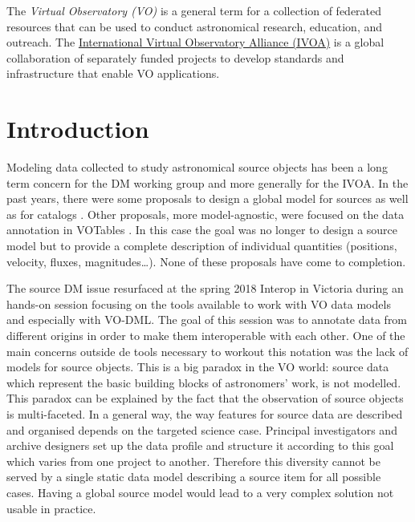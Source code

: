 \documentclass[11pt,a4paper]{ivoa}
\begin{document}
The \emph{Virtual Observatory (VO)} is a
general term for a collection of federated resources that can be used
to conduct astronomical research, education, and outreach.
The \href{http://www.ivoa.net}{International
Virtual Observatory Alliance (IVOA)} is a global
collaboration of separately funded projects to develop standards and
infrastructure that enable VO applications.


\section{Introduction}

Modeling data collected to study astronomical source objects has been a long term concern for the DM working group and more generally for the IVOA.
In the past years, there were some proposals to design a global model for sources \citep{wd:jesusdm} as well as for catalogs \citep{wd:catalog}.
Other proposals, more model-agnostic, were focused on the data annotation in VOTables \citep{note:stcvot} \citep{note:seb}. 
In this case the goal was no longer to design a source model but to provide a complete description of  individual quantities (positions, velocity, fluxes, magnitudes…).
None of these proposals have come to completion.

The source DM issue resurfaced at the spring 2018 Interop in Victoria during an hands-on session focusing on the tools available to work with VO data models and especially with VO-DML. 
The goal of this session was to annotate data from different origins in order to make them interoperable with each other.
One of the main concerns outside de tools necessary to workout this notation was the lack of models for source objects.
This is a big paradox in the VO world: source data which represent the basic building blocks of astronomers' work, is not modelled. 
This paradox can be explained by the fact that the observation of source objects is multi-faceted.
In a general way, the way features for source data are described and organised depends on the targeted science case. 
Principal investigators and archive designers set up the data profile and structure it according to this goal which varies from one project to another. 
Therefore this diversity cannot be served by a single static data model describing a source item for all possible cases.
Having a global source model would lead to a very complex solution not usable in practice.
\end{document}
